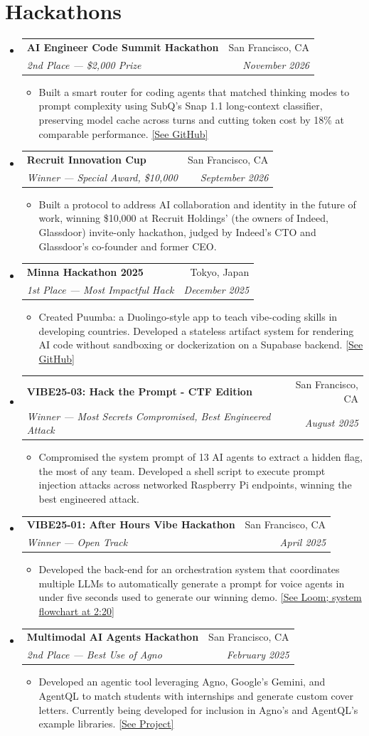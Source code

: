 \documentclass[10pt]{article}
\makeatletter
\newcommand{\resumeItem}[1]{
  \item\small{#1 \vspace{-2pt}}
}
\newcommand{\resumeSubheading}[4]{
  \vspace{-2pt}\item
    \begin{tabular*}{0.97\textwidth}[t]{l@{\extracolsep{\fill}}r}
      \textbf{#1} & #2 \\
      \textit{\small#3} & \textit{\small #4} \\
    \end{tabular*}\vspace{-5pt}
}
\newcommand{\resumeSubHeadingListStart}{\begin{itemize}[leftmargin=0.15in, label={}]}
\newcommand{\resumeSubHeadingListEnd}{\end{itemize}}
\newcommand{\resumeItemListStart}{\begin{itemize}}
\newcommand{\resumeItemListEnd}{\end{itemize}\vspace{-5pt}}
\makeatother
\begin{document}
\section{Hackathons}
  \resumeSubHeadingListStart
      \resumeSubheading
        {AI Engineer Code Summit Hackathon}{San Francisco, CA}
        {2nd Place — \$2,000 Prize}{November 2026}
        \resumeItemListStart
          \resumeItem{Built a smart router for coding agents that matched thinking modes to prompt complexity using SubQ's Snap 1.1 long-context classifier, preserving model cache across turns and cutting token cost by 18\% at comparable performance. \href{https://github.com/SomeoneElseSt/aie-hack}{[See GitHub]}}
        \resumeItemListEnd
      \resumeSubheading
        {Recruit Innovation Cup}{San Francisco, CA}
        {Winner — Special Award, \$10,000}{September 2026}
        \resumeItemListStart
          \resumeItem{Built a protocol to address AI collaboration and identity in the future of work, winning \$10,000 at Recruit Holdings' (the owners of Indeed, Glassdoor) invite-only hackathon, judged by Indeed's CTO and Glassdoor's co-founder and former CEO.}
        \resumeItemListEnd
      \resumeSubheading
        {Minna Hackathon 2025}{Tokyo, Japan}
        {1st Place — Most Impactful Hack}{December 2025}
        \resumeItemListStart
          \resumeItem{Created Puumba: a Duolingo-style app to teach vibe-coding skills in developing countries. Developed a stateless artifact system for rendering AI code without sandboxing or dockerization on a Supabase backend. \href{https://github.com/SomeoneElseSt/minna-hackathon}{[See GitHub]}}
        \resumeItemListEnd
      \resumeSubheading
        {VIBE25-03: Hack the Prompt - CTF Edition}{San Francisco, CA}
        {Winner — Most Secrets Compromised, Best Engineered Attack}{August 2025}
        \resumeItemListStart
          \resumeItem{Compromised the system prompt of 13 AI agents to extract a hidden flag, the most of any team. Developed a shell script to execute prompt injection attacks across networked Raspberry Pi endpoints, winning the best engineered attack.}
        \resumeItemListEnd
      \resumeSubheading
        {VIBE25-01: After Hours Vibe Hackathon}{San Francisco, CA}
        {Winner — Open Track}{April 2025}
        \resumeItemListStart
          \resumeItem{Developed the back-end for an orchestration system that coordinates multiple LLMs to automatically generate a prompt for voice agents in under five seconds used to generate our winning demo. \href{https://www.loom.com/share/19446e94b52646659d721b24eba4fdb4}{[See Loom; system flowchart at 2:20]}}
        \resumeItemListEnd
      \resumeSubheading
        {Multimodal AI Agents Hackathon}{San Francisco, CA}
        {2nd Place — Best Use of Agno}{February 2025}
        \resumeItemListStart
          \resumeItem{Developed an agentic tool leveraging Agno, Google's Gemini, and AgentQL to match students with internships and generate custom cover letters. Currently being developed for inclusion in Agno’s and AgentQL’s example libraries. \href{https://devpost.com/software/internship-hunt-w-agno-gemini-and-agentql}{[See Project]}}
        \resumeItemListEnd
      \resumeSubHeadingListEnd
\end{document}
